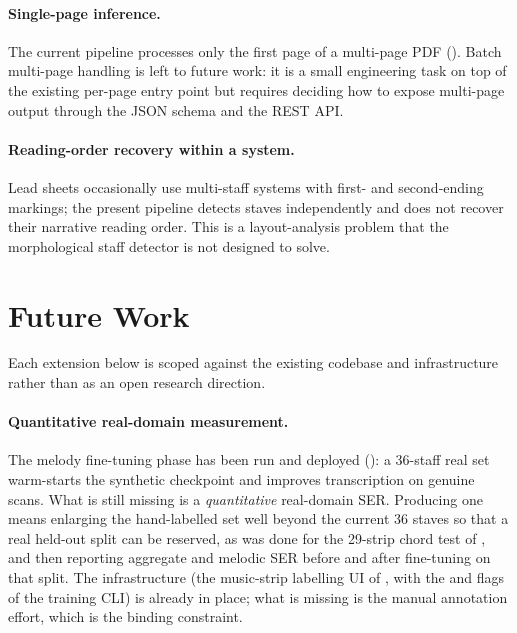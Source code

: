 \paragraph{Single-page inference.}
The current pipeline processes only the first page of a multi-page
PDF ().
Batch multi-page handling is left to future work: it is a small
engineering task on top of the existing per-page entry point but
requires deciding how to expose multi-page output through the JSON
schema and the REST API.

\paragraph{Reading-order recovery within a system.}
Lead sheets occasionally use multi-staff systems with first- and
second-ending markings; the present pipeline detects staves
independently and does not recover their narrative reading order.
This is a layout-analysis problem that the morphological staff
detector is not designed to solve.

\section{Future Work}
\label{sec:future-work}

Each extension below is scoped against the existing codebase and
infrastructure rather than as an open research direction.

\paragraph{Quantitative real-domain measurement.}
The melody fine-tuning phase has been run and deployed
(): a \num{36}-staff real set warm-starts the
synthetic checkpoint and improves transcription on genuine scans.
What is still missing is a \emph{quantitative} real-domain SER.
Producing one means enlarging the hand-labelled set well beyond the
current \num{36} staves so that a real held-out split can be reserved,
as was done for the \num{29}-strip chord test of
, and then reporting aggregate and melodic SER
before and after fine-tuning on that split.
The infrastructure (the music-strip labelling UI of
, with the  and
 flags of the training CLI) is already in
place; what is missing is the manual annotation effort, which is the
binding constraint.

